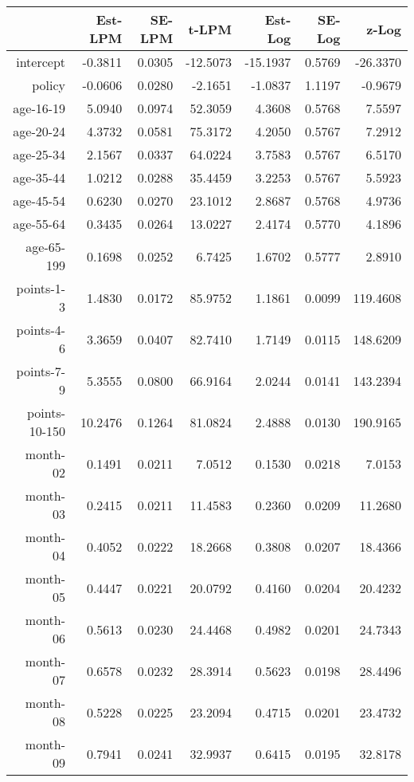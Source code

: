 \documentclass[10pt]{article}
\begin{document}
\begin{table}[ht]
\centering
\begin{tabular}{rrrrrrr}
  \hline
 & Est-LPM & SE-LPM & t-LPM & Est-Log & SE-Log & z-Log \\ 
  \hline
intercept & -0.3811 & 0.0305 & -12.5073 & -15.1937 & 0.5769 & -26.3370 \\ 
  policy & -0.0606 & 0.0280 & -2.1651 & -1.0837 & 1.1197 & -0.9679 \\ 
  age-16-19 & 5.0940 & 0.0974 & 52.3059 & 4.3608 & 0.5768 & 7.5597 \\ 
  age-20-24 & 4.3732 & 0.0581 & 75.3172 & 4.2050 & 0.5767 & 7.2912 \\ 
  age-25-34 & 2.1567 & 0.0337 & 64.0224 & 3.7583 & 0.5767 & 6.5170 \\ 
  age-35-44 & 1.0212 & 0.0288 & 35.4459 & 3.2253 & 0.5767 & 5.5923 \\ 
  age-45-54 & 0.6230 & 0.0270 & 23.1012 & 2.8687 & 0.5768 & 4.9736 \\ 
  age-55-64 & 0.3435 & 0.0264 & 13.0227 & 2.4174 & 0.5770 & 4.1896 \\ 
  age-65-199 & 0.1698 & 0.0252 & 6.7425 & 1.6702 & 0.5777 & 2.8910 \\ 
  points-1-3 & 1.4830 & 0.0172 & 85.9752 & 1.1861 & 0.0099 & 119.4608 \\ 
  points-4-6 & 3.3659 & 0.0407 & 82.7410 & 1.7149 & 0.0115 & 148.6209 \\ 
  points-7-9 & 5.3555 & 0.0800 & 66.9164 & 2.0244 & 0.0141 & 143.2394 \\ 
  points-10-150 & 10.2476 & 0.1264 & 81.0824 & 2.4888 & 0.0130 & 190.9165 \\ 
  month-02 & 0.1491 & 0.0211 & 7.0512 & 0.1530 & 0.0218 & 7.0153 \\ 
  month-03 & 0.2415 & 0.0211 & 11.4583 & 0.2360 & 0.0209 & 11.2680 \\ 
  month-04 & 0.4052 & 0.0222 & 18.2668 & 0.3808 & 0.0207 & 18.4366 \\ 
  month-05 & 0.4447 & 0.0221 & 20.0792 & 0.4160 & 0.0204 & 20.4232 \\ 
  month-06 & 0.5613 & 0.0230 & 24.4468 & 0.4982 & 0.0201 & 24.7343 \\ 
  month-07 & 0.6578 & 0.0232 & 28.3914 & 0.5623 & 0.0198 & 28.4496 \\ 
  month-08 & 0.5228 & 0.0225 & 23.2094 & 0.4715 & 0.0201 & 23.4732 \\ 
  month-09 & 0.7941 & 0.0241 & 32.9937 & 0.6415 & 0.0195 & 32.8178 \\ 

\end{tabular}
\end{table}
\end{document}
